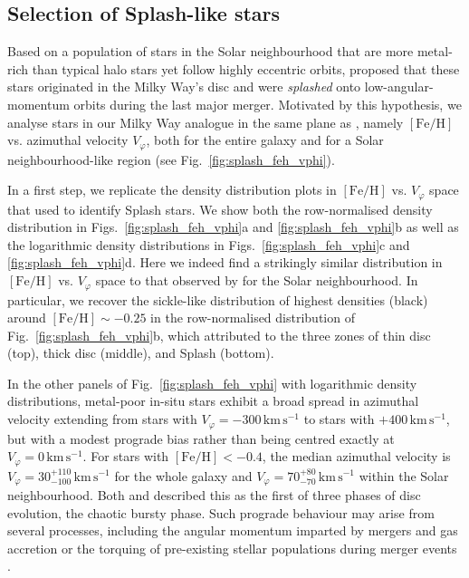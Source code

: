 \documentclass[fleqn,usenatbib]{mnras}
\begin{document}
\subsection{Selection of Splash-like stars}

Based on a population of stars in the Solar neighbourhood that are more metal-rich than typical halo stars yet follow highly eccentric orbits, \citet{Belokurov2020} proposed that these stars originated in the Milky Way’s disc and were \textit{splashed} onto low-angular-momentum orbits during the last major merger. Motivated by this hypothesis, we analyse stars in our Milky Way analogue in the same plane as \citet{Belokurov2020}, namely $\mathrm{[Fe/H]}$ vs. azimuthal velocity $V_\varphi$, both for the entire galaxy and for a Solar neighbourhood-like region (see Fig.~\ref{fig:splash_feh_vphi}).

In a first step, we replicate the density distribution plots in $\mathrm{[Fe/H]}$ vs. $V_\varphi$ space that \citet[][their Fig.~1]{Belokurov2020} used to identify Splash stars. We show both the row-normalised density distribution in Figs.~\ref{fig:splash_feh_vphi}a and \ref{fig:splash_feh_vphi}b as well as the logarithmic density distributions in Figs.~\ref{fig:splash_feh_vphi}c and \ref{fig:splash_feh_vphi}d. Here we indeed find a strikingly similar distribution in $\mathrm{[Fe/H]}$ vs. $V_\varphi$ space to that observed by \citet{Belokurov2020} for the Solar neighbourhood. In particular, we recover the sickle-like distribution of highest densities (black) around $\mathrm{[Fe/H]} \sim -0.25$ in the row-normalised distribution of Fig.~\ref{fig:splash_feh_vphi}b, which \citet{Belokurov2020} attributed to the three zones of thin disc (top), thick disc (middle), and Splash (bottom).

In the other panels of Fig.~\ref{fig:splash_feh_vphi} with logarithmic density distributions, metal-poor in-situ stars exhibit a broad spread in azimuthal velocity extending from stars with $V_\varphi = -300\,\mathrm{km\,s^{-1}}$ to stars with $+400\,\mathrm{km\,s^{-1}}$, but with a modest prograde bias rather than being centred exactly at $V_\varphi = 0\,\mathrm{km\,s^{-1}}$. For stars with $[\mathrm{Fe/H}] < -0.4$, the median azimuthal velocity is $V_\varphi = 30_{-100}^{+110}\,\mathrm{km\,s^{-1}}$ for the whole galaxy and $V_\varphi = 70_{-70}^{+80}\,\mathrm{km\,s^{-1}}$ within the Solar neighbourhood. Both \citet{Yu2023b} and \citet{Chandra2024} described this as the first of three phases of disc evolution, the chaotic bursty phase. Such prograde behaviour may arise from several processes, including the angular momentum imparted by mergers and gas accretion or the torquing of pre-existing stellar populations during merger events \citep{Santistevan2021}.
\end{document}
